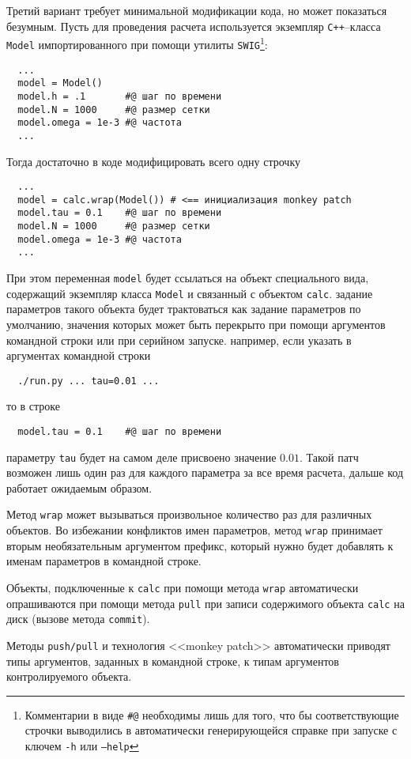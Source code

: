 Третий вариант требует минимальной модификации кода, но может показаться безумным.
Пусть для проведения расчета используется экземпляр \verb'C++'--класса \verb'Model' 
импортированного при помощи утилиты \verb'SWIG'\footnote{Комментарии в виде {\tt \#@} необходимы лишь для того, что бы соответствующие строчки выводились
  в автоматически генерирующейся справке при запуске с ключем {\tt -h} или {\tt --help}}:
\begin{verbatim}
  ...
  model = Model()
  model.h = .1       #@ шаг по времени
  model.N = 1000     #@ размер сетки
  model.omega = 1e-3 #@ частота 
  ...
\end{verbatim}
Тогда достаточно в коде модифицировать всего одну строчку
\begin{verbatim}
  ...
  model = calc.wrap(Model()) # <== инициализация monkey patch
  model.tau = 0.1    #@ шаг по времени
  model.N = 1000     #@ размер сетки
  model.omega = 1e-3 #@ частота 
  ...
\end{verbatim}
При этом переменная \verb'model' будет ссылаться на объект специального вида,
содержащий экземпляр класса \verb'Model' и связанный с объектом \verb'calc'.
задание параметров такого объекта будет трактоваться как задание параметров по умолчанию,
значения которых может быть перекрыто при помощи аргументов командной строки или при серийном запуске.
например, если указать в аргументах командной строки 
\begin{verbatim}
  ./run.py ... tau=0.01 ...
\end{verbatim}
то в строке
\begin{verbatim}
  model.tau = 0.1    #@ шаг по времени
\end{verbatim}
параметру \verb'tau' будет на самом деле присвоено значение $0.01$.
Такой патч возможен лишь один раз для каждого параметра за все время расчета, дальше
код работает ожидаемым образом.

Метод \verb'wrap' может вызываться произвольное количество раз для различных объектов.
Во избежании конфликтов имен параметров,
метод \verb'wrap' принимает вторым необязательным аргументом префикс, который нужно будет добавлять к именам параметров в командной строке.   

Объекты, подключенные к \verb'calc' при помощи  метода \verb'wrap' автоматически опрашиваются при помощи метода \verb'pull'
при записи содержимого объекта \verb'calc' на диск (вызове метода \verb'commit'). 

Методы \verb'push/pull' и технология <<monkey patch>> автоматически приводят типы аргументов, заданных в командной строке,
к типам аргументов контролируемого объекта.

